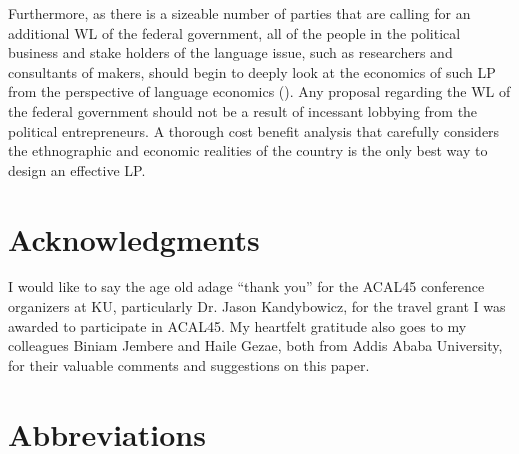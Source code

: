 \documentclass[output=paper,modfonts]{langscibook}
\begin{document}
Furthermore, as there is a sizeable number of parties that are calling for an additional WL of the federal government, all of the people in the political business and stake holders of the language issue, such as researchers and consultants of  makers, should begin to deeply look at the economics of such LP from the perspective of language economics (\citealt{Grin1994,Chiswick2008}). Any proposal regarding the WL of the federal government should not be a result of incessant lobbying from the political entrepreneurs. A thorough cost benefit analysis that carefully considers the ethnographic and economic realities of the country is the only best way to design an effective LP.

\section*{Acknowledgments}

I would like to say the age old adage “thank you” for the ACAL45 conference organizers at KU, particularly Dr. Jason Kandybowicz, for the travel grant I was awarded to participate in ACAL45. My heartfelt gratitude also goes to my colleagues Biniam Jembere and Haile Gezae, both from Addis Ababa University, for their valuable comments and suggestions on this paper.

\section*{Abbreviations}
 
\end{document}

